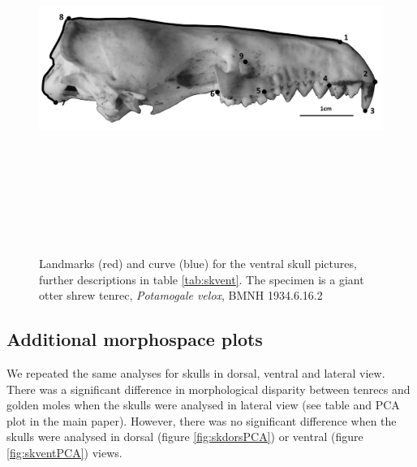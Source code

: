 \documentclass[12pt,a4paper]{article}
\begin{document}
	\begin{figure}[H] 
 	\centering
  	\includegraphics[width=12cm, height=12cm, keepaspectratio=true]
  	{figures/SkLat_BW.png}
    \caption {Landmarks (red) and curve (blue) for the ventral skull pictures, further descriptions in table \ref{tab:skvent}. The specimen is a giant otter shrew tenrec, \textit{Potamogale velox}, BMNH 1934.6.16.2}
  	\label{fig:sklat_landmarks}
  	\end{figure}


	\begin{table}[h]
	\caption{Descriptions of the landmarks (points) and curves (semilandmarks) for the skulls in lateral view (see Figure \ref{fig:sklat_landmarks}.} 
	
	\label{tab:sklat}
	\end{table}
	\subsection{Additional morphospace plots}
	
	We repeated the same analyses for skulls in dorsal, ventral and lateral view. There was a significant difference in morphological disparity between tenrecs and golden moles when the skulls were analysed in lateral view (see table and PCA plot in the main paper). However, there was no significant difference when the skulls were analysed in dorsal (figure \ref{fig:skdorsPCA}) or ventral (figure \ref{fig:skventPCA}) views.
	
\end{document}
